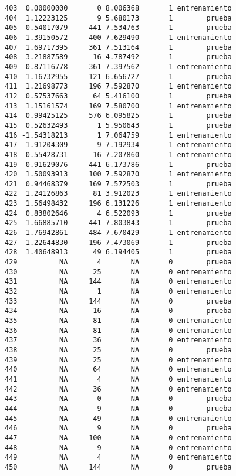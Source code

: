 \documentclass[
  letterpaper,
  DIV=11,
  numbers=noendperiod]{scrreprt}
\begin{document}
\begin{verbatim}
403  0.00000000       0 8.006368       1 entrenamiento
404  1.12223125       9 5.680173       1        prueba
405  0.54017079     441 7.534763       1        prueba
406  1.39150572     400 7.629490       1 entrenamiento
407  1.69717395     361 7.513164       1        prueba
408  3.21887589      16 4.787492       1        prueba
409  0.87116778     361 7.397562       1 entrenamiento
410  1.16732955     121 6.656727       1        prueba
411  1.21698773     196 7.592870       1 entrenamiento
412  0.57537663      64 5.416100       1        prueba
413  1.15161574     169 7.580700       1 entrenamiento
414  0.99425125     576 6.095825       1        prueba
415  0.52632493       1 5.950643       1        prueba
416 -1.54318213       1 7.064759       1 entrenamiento
417  1.91204309       9 7.192934       1 entrenamiento
418  0.55428731      16 7.207860       1 entrenamiento
419  0.91629076     441 6.173786       1        prueba
420  1.50093913     100 7.592870       1 entrenamiento
421  0.94468379     169 7.572503       1        prueba
422  1.24126863      81 3.912023       1 entrenamiento
423  1.56498432     196 6.131226       1 entrenamiento
424  0.83802646       4 6.522093       1        prueba
425  1.66885710     441 7.803843       1        prueba
426  1.76942861     484 7.670429       1 entrenamiento
427  1.22644830     196 7.473069       1        prueba
428  1.40648913      49 6.194405       1        prueba
429          NA       4       NA       0        prueba
430          NA      25       NA       0 entrenamiento
431          NA     144       NA       0 entrenamiento
432          NA       1       NA       0 entrenamiento
433          NA     144       NA       0        prueba
434          NA      16       NA       0        prueba
435          NA      81       NA       0 entrenamiento
436          NA      81       NA       0 entrenamiento
437          NA      36       NA       0 entrenamiento
438          NA      25       NA       0        prueba
439          NA      25       NA       0 entrenamiento
440          NA      64       NA       0 entrenamiento
441          NA       4       NA       0 entrenamiento
442          NA      36       NA       0 entrenamiento
443          NA       0       NA       0        prueba
444          NA       9       NA       0        prueba
445          NA      49       NA       0 entrenamiento
446          NA       9       NA       0        prueba
447          NA     100       NA       0 entrenamiento
448          NA       9       NA       0 entrenamiento
449          NA       4       NA       0 entrenamiento
450          NA     144       NA       0        prueba

\end{verbatim}
\end{document}
